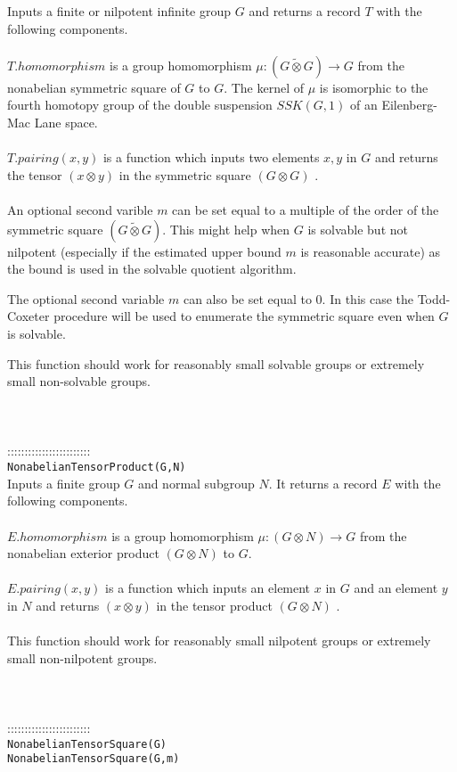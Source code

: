 \documentclass[a4paper,11pt]{report}
\begin{document}
{ Inputs a finite or nilpotent infinite group $G$ and returns a record $T$ with the following components. \\
 \\
 $T.homomorphism$ is a group homomorphism ${\ensuremath{\mu}} : (G \tilde\otimes G) \longrightarrow G$ from the nonabelian symmetric square of $G$ to $G$. The kernel of ${\ensuremath{\mu}}$ is isomorphic to the fourth homotopy group of the double suspension $SSK(G,1)$ of an Eilenberg-Mac Lane space. \\
 \\
 $T.pairing(x,y)$ is a function which inputs two elements $x, y$ in $G$ and returns the tensor $(x \otimes y)$ in the symmetric square $(G \otimes G)$ . \\
 \\
 An optional second varible $m$ can be set equal to a multiple of the order of the symmetric square $(G \tilde\otimes G)$. This might help when $G$ is solvable but not nilpotent (especially if the estimated upper bound $m$ is reasonable accurate) as the bound is used in the solvable quotient
algorithm. 

 The optional second variable $m$ can also be set equal to $0$. In this case the Todd-Coxeter procedure will be used to enumerate the
symmetric square even when $G$ is solvable. 

 This function should work for reasonably small solvable groups or extremely
small non-solvable groups. \\
 \\
 \\
 \\
 ::::::::::::::::::::::::\\
 \texttt{NonabelianTensorProduct(G,N) }\\
 

 Inputs a finite group $G$ and normal subgroup $N$. It returns a record $E$ with the following components. \\
 \\
 $E.homomorphism$ is a group homomorphism ${\ensuremath{\mu}} : (G \otimes N ) \longrightarrow G$ from the nonabelian exterior product $(G \otimes N)$ to $G$. \\
 \\
 $E.pairing(x,y)$ is a function which inputs an element $x$ in $G$ and an element $y$ in $N$ and returns $(x \otimes y)$ in the tensor product $(G \otimes N)$ . \\
 \\
 This function should work for reasonably small nilpotent groups or extremely
small non-nilpotent groups. \\
 \\
 \\
 \\
 ::::::::::::::::::::::::\\
 \texttt{NonabelianTensorSquare(G) }\\
 \texttt{NonabelianTensorSquare(G,m) }\\
 

}
\end{document}
